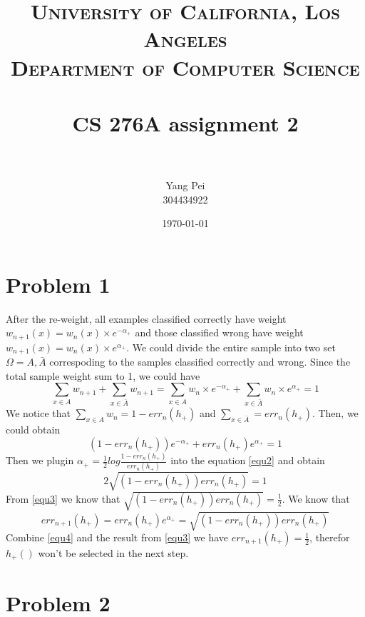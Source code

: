 \documentclass[paper=a4, fontsize=12pt]{scrartcl} %
\title{	
\normalfont \normalsize 
\textsc{University of California, Los Angeles\\
Department of Computer Science} \\ [25pt] %
\horrule{0.5pt} \\[0.4cm] %
\huge CS 276A assignment 2 \\ %
\horrule{2pt} \\[0.5cm] %
}
\author{Yang Pei\\
304434922} %
\date{\normalsize\today} %
\numberwithin{equation}{section} %
\numberwithin{figure}{section} %
\numberwithin{table}{section} %
\begin{document}
\maketitle %


\section{Problem 1}
After the re-weight, all examples classified correctly have weight $w_{n+1}(x) = w_{n}(x)\times e^{-\alpha_{+}}$ and those classified wrong have weight $w_{n+1}(x) = w_{n}(x)\times e^{\alpha_{+}}$. We could divide the entire sample into two set $\Omega = {A, \bar{A}}$ correspoding to the samples classified correctly and wrong. Since the total sample weight sum to 1, we could have
\begin{equation}
\label{equ1}
\sum_{x\in A}w_{n+1} + \sum_{x\in \bar{A}}w_{n+1} = \sum_{x\in A}w_{n}\times e^{-\alpha_{+}} + \sum_{x\in \bar{A}}w_{n}\times e^{\alpha_{+}} = 1
\end{equation}
 We notice that $\sum_{x\in A}w_{n} = 1 - err_{n}(h_{+})$ and $\sum_{x\in \bar{A}} = err_{n}(h_{+})$. Then, we could obtain
\begin{equation}
\label{equ2}
(1 - err_{n}(h_{+}))e^{-\alpha_{+}} + err_{n}(h_{+})e^{\alpha_{+}} = 1
\end{equation}
Then we plugin $\alpha_{+} = \frac{1}{2}log\frac{1-err_{n}(h_{+})}{err_{n}(h_{+})}$ into the equation \ref{equ2} and obtain
\begin{equation}
\label{equ3}
2\sqrt{(1 - err_{n}(h_{+}))err_{n}(h_{+})} = 1
\end{equation}
From \ref{equ3} we know that $\sqrt{(1 - err_{n}(h_{+}))err_{n}(h_{+})} = \frac{1}{2}$. 
We know that
\begin{equation}
\label{equ4}
err_{n+1}(h_{+}) = err_{n}(h_{+})e^{\alpha_{+}} = \sqrt{(1 - err_{n}(h_{+}))err_{n}(h_{+})}
\end{equation}
Combine \ref{equ4} and the result from \ref{equ3} we have $err_{n+1}(h_{+}) = \frac{1}{2}$, therefor $h_{+}()$ won't be selected in the next step.

\section{Problem 2}
\end{document}
